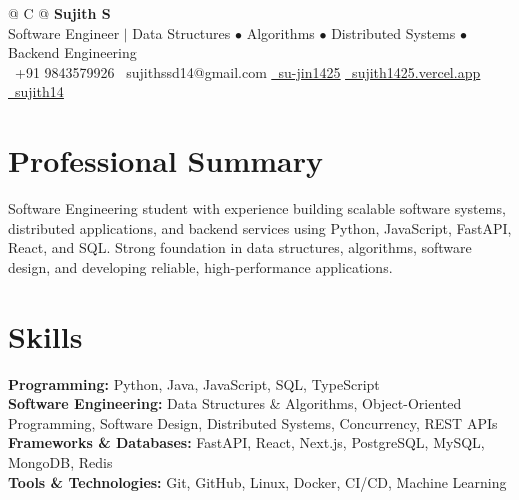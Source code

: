 \documentclass[a4paper,10pt]{article}
\newcommand{\ulink}[2]{\href{#1}{\uline{#2}}}
\begin{document}
\pagestyle{empty}

\begin{tabularx}{\linewidth}{@{} C @{}}
  {\color[HTML]{000000}\fontsize{30}{35}\selectfont\bfseries Sujith S} \\[5pt]
  {\fontsize{10.5}{12.5}\selectfont\color[HTML]{3A3A3A}Software Engineer $|$ Data Structures $\bullet$ Algorithms $\bullet$ Distributed Systems $\bullet$ Backend Engineering} \\[7pt]
  {\fontsize{10.5}{12.5}\selectfont
    \textcolor[HTML]{3A3A3A}{%
    {}\ +91 9843579926
    \quad
    {\faEnvelope}\ sujithssd14@gmail.com
    \quad
    \ulink{https://github.com/su-jin1425}{{\faGithub}\ su-jin1425}
    \quad
    \ulink{https://sujith1425.vercel.app}{{\faGlobe}\ sujith1425.vercel.app}
    \quad
    \ulink{https://linkedin.com/in/sujith14}{{\faLinkedin}\ sujith14}
    }
}
\end{tabularx}

\vspace{4pt}

\section{Professional Summary}
\vspace{2pt}
{\color[HTML]{0A0A0A}\fontsize{11}{15}\selectfont
Software Engineering student with experience building scalable software systems, distributed applications, and backend services using Python, JavaScript, FastAPI, React, and SQL. Strong foundation in data structures, algorithms, software design, and developing reliable, high-performance applications.
}

\vspace{4pt}

\section{Skills}
\vspace{3pt}
{\color[HTML]{0A0A0A}\fontsize{11}{15}\selectfont
\textbf{Programming:} Python, Java, JavaScript, SQL, TypeScript \\[4pt]
\textbf{Software Engineering:} Data Structures \& Algorithms, Object-Oriented Programming, Software Design, Distributed Systems, Concurrency, REST APIs \\[4pt]
\textbf{Frameworks \& Databases:} FastAPI, React, Next.js, PostgreSQL, MySQL, MongoDB, Redis \\[4pt]
\textbf{Tools \& Technologies:} Git, GitHub, Linux, Docker, CI/CD, Machine Learning
}
\end{document}
